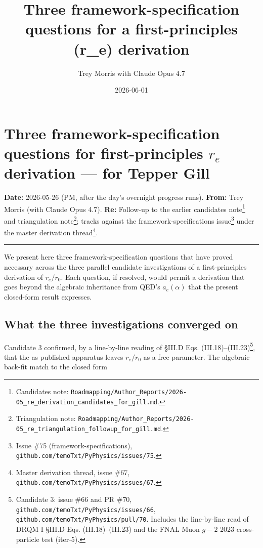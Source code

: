 \documentclass[
  11pt,
]{article}
\title{Three framework-specification questions for a first-principles
(r\_e) derivation}
\author{Trey Morris with Claude Opus 4.7}
\date{2026-06-01}
\begin{document}
\maketitle

\hypertarget{three-framework-specification-questions-for-first-principles-r_e-derivation-for-tepper-gill}{%
\section{\texorpdfstring{Three framework-specification questions for
first-principles \(r_e\) derivation --- for Tepper
Gill}{Three framework-specification questions for first-principles r\_e derivation --- for Tepper Gill}}\label{three-framework-specification-questions-for-first-principles-r_e-derivation-for-tepper-gill}}

\textbf{Date:} 2026-05-26 (PM, after the day's overnight progress runs).
\textbf{From:} Trey Morris (with Claude Opus 4.7). \textbf{Re:}
Follow-up to the earlier candidates note\footnote{Candidates note:
  \texttt{Roadmapping/Author\_Reports/2026-05\_re\_derivation\_candidates\_for\_gill.md}.}
and triangulation note\footnote{Triangulation note:
  \texttt{Roadmapping/Author\_Reports/2026-05\_re\_triangulation\_followup\_for\_gill.md}.};
tracks against the framework-specifications issue\footnote{Issue \#75
  (framework-specifications),
  \texttt{github.com/temoTxt/PyPhysics/issues/75}.} under the master
derivation thread\footnote{Master derivation thread, issue \#67,
  \texttt{github.com/temoTxt/PyPhysics/issues/67}.}.

\begin{center}\rule{0.5\linewidth}{0.5pt}\end{center}

We present here three framework-specification questions that have proved
necessary across the three parallel candidate investigations of a
first-principles derivation of \(r_e/r_0\). Each question, if resolved,
would permit a derivation that goes beyond the algebraic inheritance
from QED's \(a_e(\alpha)\) that the present closed-form result
expresses.

\hypertarget{what-the-three-investigations-converged-on}{%
\subsection{What the three investigations converged
on}\label{what-the-three-investigations-converged-on}}

Candidate 3 confirmed, by a line-by-line reading of §III.D Eqs.
(III.18)--(III.23)\footnote{Candidate 3: issue \#66 and PR \#70,
  \texttt{github.com/temoTxt/PyPhysics/issues/66},
  \texttt{github.com/temoTxt/PyPhysics/pull/70}. Includes the
  line-by-line read of DRQM I §III.D Eqs. (III.18)--(III.23) and the
  FNAL Muon \(g-2\) 2023 cross-particle test (iter-5).}, that the
as-published apparatus leaves \(r_e/r_0\) as a free parameter. The
algebraic-back-fit match to the closed form
\end{document}
